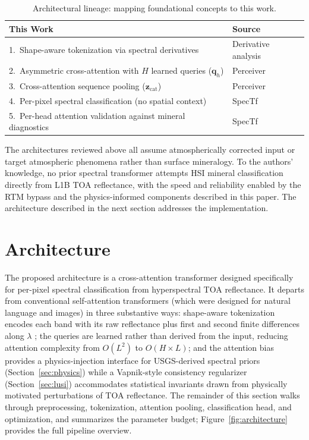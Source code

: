 \documentclass[preprint,12pt]{elsarticle}
\begin{document}
\begin{table}[!htbp]
\centering
\small
\caption{Architectural lineage: mapping foundational concepts to this work.}
\label{tab:arch_inspirations}
\begin{tabular}{p{}p{}}
\hline
\rowcolor[gray]{0.85}
\textbf{This Work} & \textbf{Source} \\
\hline
1.\ Shape-aware tokenization via spectral derivatives & Derivative analysis \cite{tsai1998derivative} \\
\hline
2.\ Asymmetric cross-attention with $H$ learned queries ($\mathbf{q}_h$) & Perceiver \cite{jaegle2021perceiver} \\
\hline
3.\ Cross-attention sequence pooling ($\mathbf{z}_{\text{cat}}$) & Perceiver \cite{jaegle2021perceiver} \\
\hline
4.\ Per-pixel spectral classification (no spatial context) & SpecTf \cite{lee2025spectf} \\
\hline
5.\ Per-head attention validation against mineral diagnostics & SpecTf \cite{lee2025spectf} \\
\hline
\end{tabular}
\end{table}

The architectures reviewed above all assume atmospherically corrected input or target atmospheric phenomena rather than surface mineralogy. 
To the authors' knowledge, no prior spectral transformer attempts HSI mineral classification directly from L1B TOA reflectance, with the speed and reliability enabled by the RTM bypass and the physics-informed components described in this paper.
The architecture described in the next section addresses the implementation.

\section{Architecture}
\label{sec:architecture}

The proposed architecture is a cross-attention transformer designed specifically for per-pixel spectral classification from hyperspectral TOA reflectance. 
It departs from conventional self-attention transformers (which were designed for natural language and images) in three substantive ways: shape-aware tokenization encodes each band with its raw reflectance plus first and second finite differences along $\lambda$ \cite{tsai1998derivative}; the queries are learned rather than derived from the input, reducing attention complexity from $O(L^2)$ to $O(H \times L)$; and the attention bias provides a physics-injection interface for USGS-derived spectral priors (Section~\ref{sec:physics}) while a Vapnik-style consistency regularizer (Section~\ref{sec:lusi}) accommodates statistical invariants drawn from physically motivated perturbations of TOA reflectance.
The remainder of this section walks through preprocessing, tokenization, attention pooling, classification head, and optimization, and summarizes the parameter budget; Figure~\ref{fig:architecture} provides the full pipeline overview.
\end{document}
